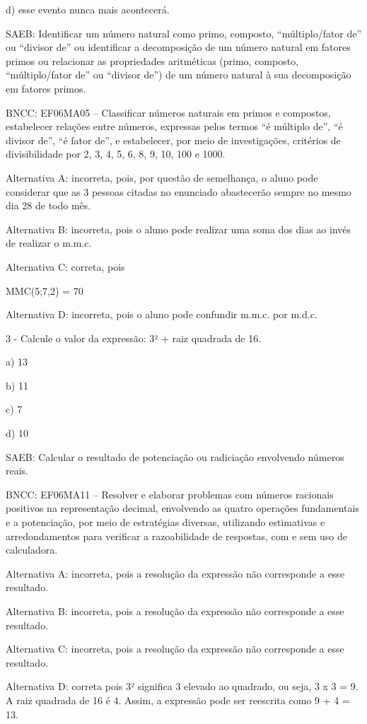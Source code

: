 d) esse evento nunca mais acontecerá.

SAEB: Identificar um número natural como primo, composto,
``múltiplo/fator de'' ou ``divisor de'' ou identificar a decomposição de
um número natural em fatores primos ou relacionar as propriedades
aritméticas (primo, composto, ``múltiplo/fator de'' ou ``divisor de'')
de um número natural à sua decomposição em fatores primos.

BNCC: EF06MA05 -- Classificar números naturais em primos e compostos,
estabelecer relações entre números, expressas pelos termos ``é múltiplo
de'', ``é divisor de'', ``é fator de'', e estabelecer, por meio de
investigações, critérios de divisibilidade por 2, 3, 4, 5, 6, 8, 9, 10,
100 e 1000.

Alternativa A: incorreta, pois, por questão de semelhança, o aluno pode
considerar que as 3 pessoas citadas no enunciado abastecerão sempre no
mesmo dia 28 de todo mês.

Alternativa B: incorreta, pois o aluno pode realizar uma soma dos dias
ao invés de realizar o m.m.c.

Alternativa C: correta, pois

MMC(5;7,2) = 70

Alternativa D: incorreta, pois o aluno pode confundir m.m.c. por m.d.c.

3 - Calcule o valor da expressão: 3² + raiz quadrada de 16.

a) 13

b) 11

c) 7

d) 10

SAEB: Calcular o resultado de potenciação ou radiciação envolvendo
números reais.

BNCC: EF06MA11 -- Resolver e elaborar problemas com números racionais
positivos na representação decimal, envolvendo as quatro operações
fundamentais e a potenciação, por meio de estratégias diversas,
utilizando estimativas e arredondamentos para verificar a razoabilidade
de respostas, com e sem uso de calculadora.

Alternativa A: incorreta, pois a resolução da expressão não corresponde
a esse resultado.

Alternativa B: incorreta, pois a resolução da expressão não corresponde
a esse resultado.

Alternativa C: incorreta, pois a resolução da expressão não corresponde
a esse resultado.

Alternativa D: correta pois 3² significa 3 elevado ao quadrado, ou seja,
3 x 3 = 9. A raiz quadrada de 16 é 4. Assim, a expressão pode ser
reescrita como 9 + 4 = 13.

